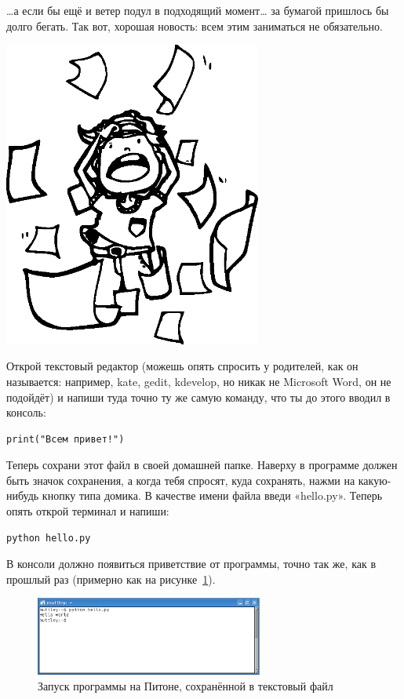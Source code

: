 …а если бы ещё и ветер подул в подходящий момент… за бумагой пришлось бы долго бегать. Так вот, хорошая новость: всем этим заниматься не обязательно.

\begin{center}
\includegraphics*[width=85mm]{../en/pullinghair.eps}
\end{center}

Открой текстовый редактор (можешь опять спросить у родителей, как он называется: например, kate, gedit, kdevelop, но никак не Microsoft Word, он не подойдёт) и напиши туда точно ту же самую команду, что ты до этого вводил в консоль:

\begin{verbatim}
print("Всем привет!")
\end{verbatim}

Теперь сохрани этот файл в своей домашней папке. Наверху в программе должен быть значок сохранения, а когда тебя спросят, куда сохранять, нажми на какую-нибудь кнопку типа домика. В качестве имени файла введи «hello.py». Теперь опять открой терминал и напиши:

\begin{verbatim}
python hello.py
\end{verbatim}

В консоли должно появиться приветствие от программы, точно так же, как в прошлый раз (примерно как на рисунке \ref{fig9}).

\begin{figure}
\begin{center}
\includegraphics[width=75mm]{../en/figure9.eps}
\end{center}
\caption{Запуск программы на Питоне, сохранённой в текстовый файл}\label{fig9}
\end{figure}

